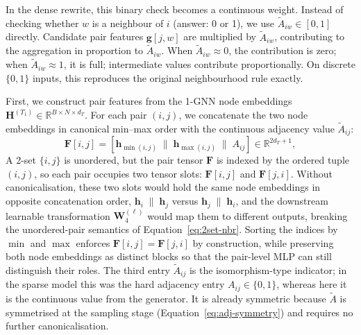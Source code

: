 \documentclass[12pt,a4paper]{article}
\begin{document}
In the dense rewrite, this binary check becomes a continuous weight. Instead of checking whether $w$ is a neighbour of $i$ (answer: 0 or 1), we use $\tilde{A}_{iw} \in [0, 1]$ directly. Candidate pair features $\mathbf{g}[j, w]$ are multiplied by $\tilde{A}_{iw}$, contributing to the aggregation in proportion to $\tilde{A}_{iw}$. When $\tilde{A}_{iw} \approx 0$, the contribution is zero; when $\tilde{A}_{iw} \approx 1$, it is full; intermediate values contribute proportionally. On discrete $\{0, 1\}$ inputs, this reproduces the original neighbourhood rule exactly.

First, we construct pair features from the 1-GNN node embeddings $\mathbf{H}^{(T_1)} \in \mathbb{R}^{B \times N \times d_T}$. For each pair $(i, j)$, we concatenate the two node embeddings in canonical min--max order with the continuous adjacency value $\tilde{A}_{ij}$:
\begin{equation}
  \mathbf{F}[i,j] = \left[\mathbf{h}_{\min(i,j)} \;\|\; \mathbf{h}_{\max(i,j)} \;\|\; A_{ij}\right] \in \mathbb{R}^{2d_T + 1},
  \label{eq:dense-2gnn-feat}
\end{equation}
A 2-set $\{i, j\}$ is unordered, but the pair tensor $\mathbf{F}$ is indexed by the ordered tuple $(i, j)$, so each pair occupies two tensor slots: $\mathbf{F}[i,j]$ and $\mathbf{F}[j,i]$. Without canonicalisation, these two slots would hold the same node embeddings in opposite concatenation order, $\mathbf{h}_i \;\|\; \mathbf{h}_j$ versus $\mathbf{h}_j \;\|\; \mathbf{h}_i$, and the downstream learnable transformation $\mathbf{W}_4^{(\ell)}$ would map them to different outputs, breaking the unordered-pair semantics of Equation~\eqref{eq:2set-nbr}. Sorting the indices by $\min$ and $\max$ enforces $\mathbf{F}[i,j] = \mathbf{F}[j,i]$ by construction, while preserving both node embeddings as distinct blocks so that the pair-level MLP can still distinguish their roles. The third entry $\tilde{A}_{ij}$ is the isomorphism-type indicator; in the sparse model this was the hard adjacency entry $A_{ij} \in \{0,1\}$, whereas here it is the continuous value from the generator. It is already symmetric because $\tilde{A}$ is symmetrised at the sampling stage (Equation~\eqref{eq:adj-symmetry}) and requires no further canonicalisation.
\end{document}
